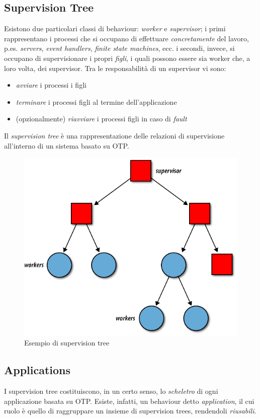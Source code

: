 %
\subsection{Supervision Tree}
%
Esistono due particolari classi di behaviour: \emph{worker} e \emph{supervisor}\cite{otpsupervisor}; 
%
i primi rappresentano i processi che si occupano di effettuare \emph{concretamente} del lavoro, 
p.es. \emph{servers}, \emph{event handlers}, \emph{finite state machines}, ecc.
%
i secondi, invece, si occupano di supervisionare i propri \emph{figli}, i quali possono essere sia
worker che, a loro volta, dei supervisor. 
%
Tra le responsabilit\`a di un supervisor vi sono:
\begin{itemize}
\item \emph{avviare} i processi i figli
\item \emph{terminare} i processi figli al termine dell'applicazione
\item (opzionalmente) \emph{riavviare} i processi figli in caso di \emph{fault}
\end{itemize}
%

%
Il \emph{supervision tree} \`e una rappresentazione delle relazioni di supervisione 
all'interno di un sistema basato su OTP.
%
\begin{figure}[!h]
\centering
\includegraphics[width=350pt]{img/supervision-tree.png}
\caption{Esempio di supervision tree}
\end{figure}
%

%

%
\subsection{Applications}
%
I supervision tree costituiscono, in un certo senso, lo \emph{scheletro} di ogni applicazione
basata su OTP. Esiste, infatti, un behaviour detto \emph{application}\cite{erlapplication}, 
il cui ruolo \`e quello di raggruppare un insieme di supervision trees, rendendoli 
\emph{riusabili}. 
%

